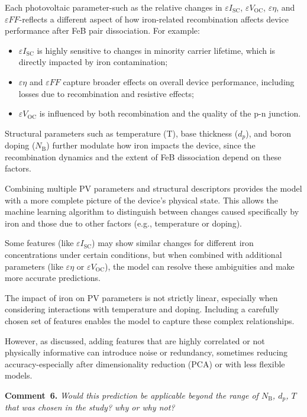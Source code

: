 \documentclass[a4paper,fleqn]{cas-sc}
\begin{document}
Each photovoltaic parameter-such as the relative changes in $\varepsilon I_\mathrm{SC}$, $\varepsilon V_\mathrm{OC}$, $\varepsilon \eta$, and $\varepsilon FF$-reflects a different aspect of how iron-related recombination affects device performance after FeB pair dissociation. For example:
\begin{itemize}
    \item $\varepsilon I_\mathrm{SC}$ is highly sensitive to changes in minority carrier lifetime, which is directly impacted by iron contamination;
    \item $\varepsilon \eta$ and $\varepsilon FF$ capture broader effects on overall device performance, including losses due to recombination and resistive effects;
    \item $\varepsilon V_\mathrm{OC}$ is influenced by both recombination and the quality of the p-n junction.
\end{itemize}

Structural parameters such as temperature (T), base thickness ($d_p$), and boron doping ($N_\mathrm{B}$) further modulate how iron impacts the device, since the recombination dynamics and the extent of FeB dissociation depend on these factors.


Combining multiple PV parameters and structural descriptors provides the model with a more complete picture of the device’s physical state. This allows the machine learning algorithm to distinguish between changes caused specifically by iron and those due to other factors (e.g., temperature or doping).


Some features (like $\varepsilon I_\mathrm{SC}$) may show similar changes for different iron concentrations under certain conditions, but when combined with additional parameters (like $\varepsilon \eta$ or $\varepsilon V_\mathrm{OC}$), the model can resolve these ambiguities and make more accurate predictions.


The impact of iron on PV parameters is not strictly linear, especially when considering interactions with temperature and doping. 
Including a carefully chosen set of features enables the model to capture these complex relationships.


However, as discussed, adding features that are highly correlated or not physically informative can introduce noise or redundancy, sometimes reducing accuracy-especially after dimensionality reduction (PCA) or with less flexible models.

\vspace{1cm}
\noindent
\textcolor[rgb]{0.00,0.50,1.00}{\textbf{Comment~6.}}
\emph{Would this prediction be applicable beyond the range of $N_\mathrm{B}$, $d_p$, $T$ that was chosen in the study? why or why not?}
\end{document}
